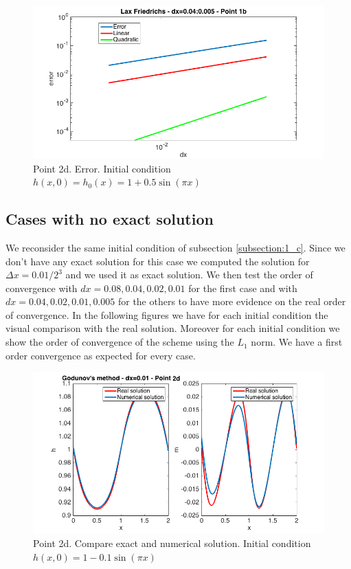 \documentclass[oneside,12pt]{book}  %
\theoremstyle{plain}
\theoremstyle{definition}
\theoremstyle{remark}
\numberwithin{equation}{chapter} %
\begin{document}
\begin{figure}[h]
\label{img:roe_2b_error}
\centering
\includegraphics[scale=0.5]{Immagini/LF/1b-error.png}
\caption{Point 2d. Error. Initial condition $h(x,0)=h_0(x)=1+0.5\sin(\pi x)$}
\end{figure}


\subsection{Cases with no exact solution}
We reconsider the same initial condition of subsection
\ref{subsection:1_c}. Since we don't have any exact solution for this case we computed the
solution for $\Delta x=0.01/2^3$ and we used it as exact solution. We
then test the order of convergence with $dx=0.08, 0.04, 0.02,
0.01$ for the first case and with $dx=0.04, 0.02,
0.01, 0.005$ for the others to have more evidence on the real order of
convergence. In the following figures we have for each initial
condition the visual comparison with the real solution. Moreover for
each initial condition we show the order of convergence of the scheme
using the $L_1$ norm. We have a first order convergence as expected
for every case. 


\begin{figure}[h]
\label{img:roe_2c_1_solution}
\centering
\includegraphics[scale=0.5]{Immagini/LF/2c-1-solution.png}
\caption{Point 2d. Compare exact and numerical solution. Initial condition $h(x,0)=1-0.1\sin(\pi x)$}
\end{figure}
\end{document}
